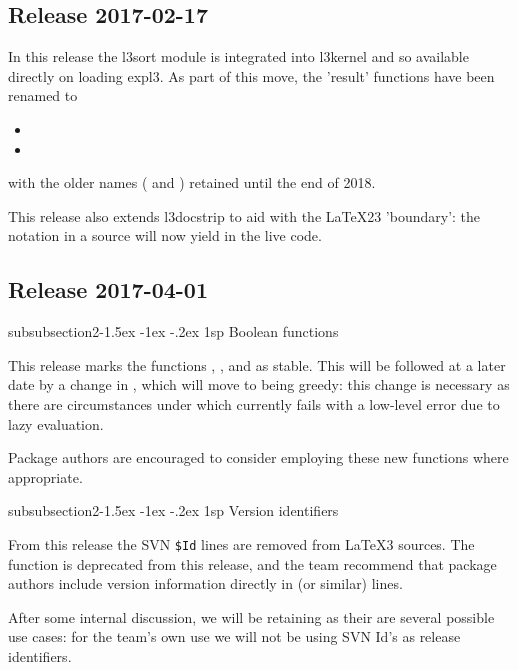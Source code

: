 \documentclass{ltnews}
\makeatletter
\renewcommand{\subsubsection}{%
   \@startsection
      {subsubsection}{2}{\leftmargini}{-1.5ex \@plus -1ex \@minus -.2ex}%
      {1sp}{\@subheadingfont}%
}
\makeatother
\begin{document}
\subsection{Release 2017-02-17}

In this release the l3sort module is integrated
into l3kernel and so available directly on loading
expl3. As part of this move, the 'result' functions
have been renamed to
\begin{itemize}
\item {}
\item {}
\end{itemize}  
with the older names ( and
) retained until the end of 2018.

This release also extends l3docstrip to aid with
the LaTeX23 'boundary': the notation  in a
source will now yield  in the live code.


\subsection{Release 2017-04-01}

\subsubsection{Boolean functions}

This release marks the functions
,
,
 and
as stable. This will be followed at a later date by a change in
, which will move to being greedy: this change is
necessary as there are circumstances under which 
currently fails with a low-level error due to lazy evaluation.

Package authors are encouraged to consider employing these new functions
where appropriate.

\subsubsection{Version identifiers}

From this release the SVN \verb=$Id= lines are removed from \LaTeX3 sources. The
function  is deprecated from this release, and the team
recommend that package authors include version information directly in
 (or similar) lines.


After some internal discussion, we will be retaining  as their
are several possible use cases: for the team's own use we will not be
using SVN Id's as release identifiers.
\end{document}

